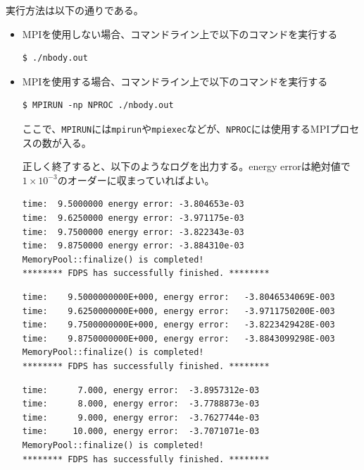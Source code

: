 実行方法は以下の通りである。
\begin{itemize}
\item MPIを使用しない場合、コマンドライン上で以下のコマンドを実行する
\begin{screen}
\begin{verbatim}
$ ./nbody.out
\end{verbatim}
\end{screen}
  
\item MPIを使用する場合、コマンドライン上で以下のコマンドを実行する
\begin{screen}
\begin{verbatim}
$ MPIRUN -np NPROC ./nbody.out
\end{verbatim}
\end{screen}
ここで、\texttt{MPIRUN}には\texttt{mpirun}や\texttt{mpiexec}などが、\texttt{NPROC}には使用するMPIプロセスの数が入る。

正しく終了すると、以下のようなログを出力する。energy errorは絶対値で$1 \times 10^{-3}$のオーダーに収まっていればよい。
\ifCpp%
\begin{screen}
\begin{verbatim}
time:  9.5000000 energy error: -3.804653e-03
time:  9.6250000 energy error: -3.971175e-03
time:  9.7500000 energy error: -3.822343e-03
time:  9.8750000 energy error: -3.884310e-03
MemoryPool::finalize() is completed!
******** FDPS has successfully finished. ********
\end{verbatim}
\end{screen}
\endifCpp
\ifFtn%
\begin{screen}
\begin{verbatim}
time:    9.5000000000E+000, energy error:   -3.8046534069E-003
time:    9.6250000000E+000, energy error:   -3.9711750200E-003
time:    9.7500000000E+000, energy error:   -3.8223429428E-003
time:    9.8750000000E+000, energy error:   -3.8843099298E-003
MemoryPool::finalize() is completed!
******** FDPS has successfully finished. ********
\end{verbatim}
\end{screen}
\endifFtn
\ifC %
\begin{screen}
\begin{verbatim}
time:      7.000, energy error:  -3.8957312e-03
time:      8.000, energy error:  -3.7788873e-03
time:      9.000, energy error:  -3.7627744e-03
time:     10.000, energy error:  -3.7071071e-03
MemoryPool::finalize() is completed!
******** FDPS has successfully finished. ********
\end{verbatim}
\end{screen}
\endifC
\end{itemize}

